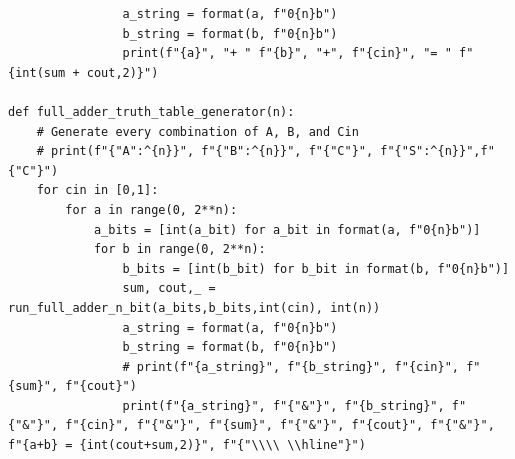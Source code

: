 \documentclass{exam}
\begin{document}
\begin{verbatim}
                a_string = format(a, f"0{n}b")
                b_string = format(b, f"0{n}b")
                print(f"{a}", "+ " f"{b}", "+", f"{cin}", "= " f"{int(sum + cout,2)}")

def full_adder_truth_table_generator(n):
    # Generate every combination of A, B, and Cin
    # print(f"{"A":^{n}}", f"{"B":^{n}}", f"{"C"}", f"{"S":^{n}}",f"{"C"}")
    for cin in [0,1]:
        for a in range(0, 2**n):
            a_bits = [int(a_bit) for a_bit in format(a, f"0{n}b")]
            for b in range(0, 2**n):
                b_bits = [int(b_bit) for b_bit in format(b, f"0{n}b")]
                sum, cout,_ = run_full_adder_n_bit(a_bits,b_bits,int(cin), int(n))
                a_string = format(a, f"0{n}b")
                b_string = format(b, f"0{n}b")
                # print(f"{a_string}", f"{b_string}", f"{cin}", f"{sum}", f"{cout}")
                print(f"{a_string}", f"{"&"}", f"{b_string}", f"{"&"}", f"{cin}", f"{"&"}", f"{sum}", f"{"&"}", f"{cout}", f"{"&"}", f"{a+b} = {int(cout+sum,2)}", f"{"\\\\ \\hline"}")

        \end{verbatim} 
\end{document}
